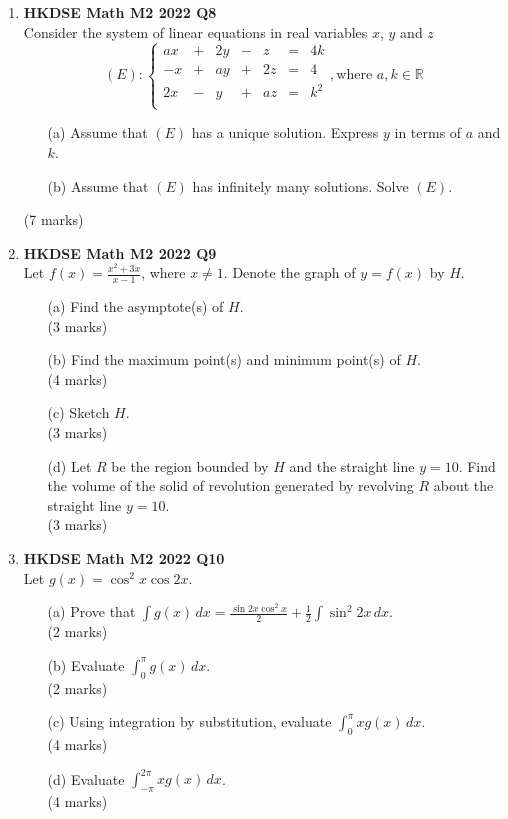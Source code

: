 \documentclass[12pt]{article}
\begin{document}
\begin{enumerate}
	\item \textbf{HKDSE Math M2 2022 Q8}\\
	Consider the system of linear equations in real variables $x$, $y$ and $z$
		$$(E) : \left\{\begin{matrix}
		ax&  +&2y&  -& z& = &4k  \\
		-x&  +&ay&  +&2z& = &4   \\
		2x&  -& y&  +&az& = &k^2 \\
		\end{matrix}\right. , \text{where } a,k \in \mathbb{R}$$
	\begin{enumerate}
		\item [(a)] Assume that $(E)$ has a unique solution. Express $y$ in terms of $a$ and $k$.
		\item [(b)] Assume that $(E)$ has infinitely many solutions. Solve $(E)$. 
	\end{enumerate}
	(7 marks)

	\item \textbf{HKDSE Math M2 2022 Q9}\\
	Let $\displaystyle f(x) = \frac{x^2 +3x}{x-1}$, where $x \neq 1$. Denote the graph of $y = f(x)$ by $H$.
	\begin{enumerate}
		\item [(a)] Find the asymptote(s) of $H$. \\(3 marks)
		\item [(b)] Find the maximum point(s) and minimum point(s) of $H$. \\(4 marks)
		\item [(c)] Sketch $H$. \\(3 marks)
		\item [(d)] Let $R$ be the region bounded by $H$ and the straight line $y = 10$. Find the volume of the solid of revolution generated by revolving $R$ about the straight line $y = 10$. \\(3 marks)
	\end{enumerate}

	\item \textbf{HKDSE Math M2 2022 Q10}\\
	Let $g(x) = \cos^2{x}\cos{2x}$.
	\begin{enumerate}
		\item [(a)] Prove that $\displaystyle \int g(x) \,dx = \frac{\sin{2x}\cos^2{x}}{2} + \frac{1}{2} \int \sin^2{2x}\,dx$. \\(2 marks)
		\item [(b)] Evaluate $\displaystyle \int _{0}^{\pi} g(x) \,dx$. \\(2 marks)
		\item [(c)] Using integration by substitution, evaluate $\displaystyle \int _{0}^{\pi} xg(x) \,dx$. \\(4 marks)
		\item [(d)] Evaluate $\displaystyle \int _{-\pi}^{2\pi} xg(x) \,dx$. \\(4 marks)
	\end{enumerate}


\end{enumerate}
\end{document}

